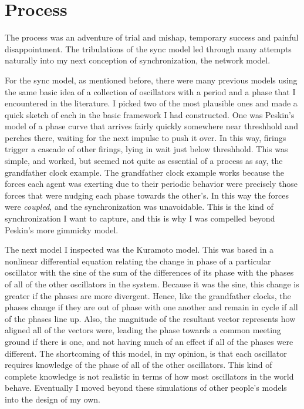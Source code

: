 \documentclass[12pt]{article}
\begin{document}
\section{Process}

The process was an adventure of trial and mishap, temporary success and painful disappointment.   The tribulations of the sync model led through many attempts naturally into my next conception of synchronization, the network model.  

For the sync model, as mentioned before, there were many previous models using the same basic idea of a collection of oscillators with a period and a phase that I encountered in the literature.  I picked two of the most plausible ones and made a quick sketch of each in the basic framework I had constructed.  One was Peskin's model of a phase curve that arrives fairly quickly somewhere near threshhold and perches there, waiting for the next impulse to push it over.  In this way, firings trigger a cascade of other firings, lying in wait just below threshhold.  This was simple, and worked, but seemed not quite as essential of a process as say, the grandfather clock example.  The grandfather clock example works because the forces each agent was exerting due to their periodic behavior were precisely those forces that were nudging each phase towards the other's.  In this way the forces were {\em coupled}, and the synchronization was unavoidable.  This is the kind of synchronization I want to capture, and this is why I was compelled beyond Peskin's more gimmicky model.  

The next model I inspected was the Kuramoto model.  This was based in a nonlinear differential equation relating the change in phase of a particular oscillator with the sine of the sum of the differences of its phase with the phases of all of the other oscillators in the system.  Because it was the sine, this change is greater if the phases are more divergent.  Hence, like the grandfather clocks, the phases change if they are out of phase with one another and remain in cycle if all of the phases line up.  Also, the magnitude of the resultant vector represents how aligned all of the vectors were, leading the phase towards a common meeting ground if there is one, and not having much of an effect if all of the phases were different.  The shortcoming of this model, in my opinion, is that each oscillator requires knowledge of the phase of all of the other oscillators.  This kind of complete knowledge is not realistic in terms of how most oscillators in the world behave.  Eventually I moved beyond these simulations of other people's models into the design of my own.  
\end{document}
